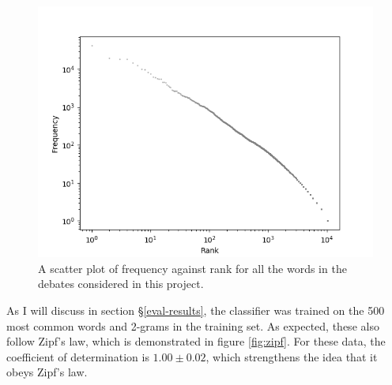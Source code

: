 \documentclass[12pt,a4paper,twoside,openright]{report}
\begin{document}
\\\\
\begin{figure}
	\begin{center}
		\includegraphics[scale=1]{figs/bigzipf.png}
	\end{center}
	\caption{A scatter plot of frequency against rank for all the words in the debates considered in this project.}
	\label{fig:bigzipf}
\end{figure}
As I will discuss in section \S\ref{eval-results}, the classifier was trained on the 500 most common words and 2-grams in the training set. As expected, these also follow Zipf's law, which is demonstrated in figure \ref{fig:zipf}. For these data, the coefficient of determination is $1.00 \pm 0.02$\footnotemark[\value{footnote}], which strengthens the idea that it obeys Zipf's law.
\\\\

\end{document}
